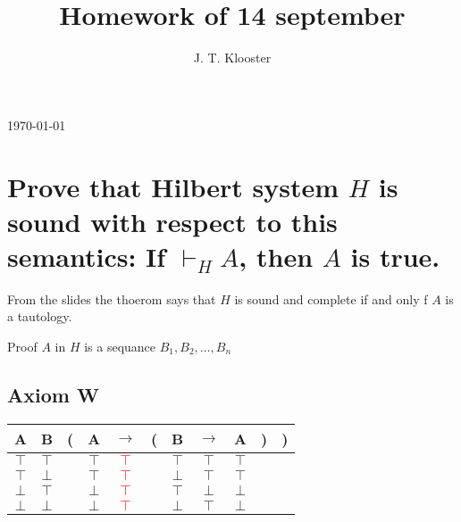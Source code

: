 \documentclass{article}
\begin{document}
\author{J. T. Klooster}
\title{Homework of 14 september}
\maketitle
\today
\section{Prove that Hilbert system $H$ is sound with respect to this
semantics: If $\vdash_H A$, then $A$ is true.}

From the slides the thoerom says that $H$ is sound and complete
if and only f $A$ is a tautology.

Proof $A$ in $H$ is a sequance $B_1, B_2, \ldots, B_n$

\subsection{Axiom W}
\begin{tabular}{@{ }c@{ }@{ }c | c@{}@{ }c@{ }@{ }c@{ }@{}c@{}@{ }c@{ }@{ }c@{ }@{ }c@{ }@{}c@{}@{}c@{ }}
A & B & ( & A & $\rightarrow$ & ( & B & $\rightarrow$ & A & ) & )\\
\hline 
$\top$ & $\top$ &  & $\top$ & \textcolor{red}{$\top$} &  & $\top$ & $\top$ & $\top$ &  & \\
$\top$ & $\bot$ &  & $\top$ & \textcolor{red}{$\top$} &  & $\bot$ & $\top$ & $\top$ &  & \\
$\bot$ & $\top$ &  & $\bot$ & \textcolor{red}{$\top$} &  & $\top$ & $\bot$ & $\bot$ &  & \\
$\bot$ & $\bot$ &  & $\bot$ & \textcolor{red}{$\top$} &  & $\bot$ & $\top$ & $\bot$ &  & \\
\end{tabular}
\end{document}

